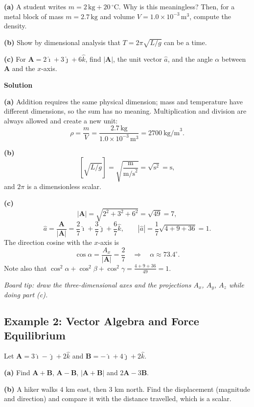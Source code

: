\documentclass[12pt]{article}
\begin{document}
\textbf{(a)} A student writes $m = 2\,\text{kg} + 20\,^\circ\text{C}$. Why is this meaningless? Then, for a metal block of mass $m = 2.7\,\text{kg}$ and volume $V = 1.0\times 10^{-3}\,\text{m}^3$, compute the density.

\textbf{(b)} Show by dimensional analysis that $T = 2\pi\sqrt{L/g}$ can be a time.

\textbf{(c)} For $\mathbf{A} = 2\hat{\imath} + 3\hat{\jmath} + 6\hat{k}$, find $|\mathbf{A}|$, the unit vector $\hat{a}$, and the angle $\alpha$ between $\mathbf{A}$ and the $x$-axis.

\bigskip
\textbf{Solution}

\textbf{(a)} Addition requires the same physical dimension; mass and temperature have different dimensions, so the sum has no meaning. Multiplication and division are always allowed and create a new unit:
\[
\rho = \frac{m}{V} = \frac{2.7\,\text{kg}}{1.0\times 10^{-3}\,\text{m}^3} = 2700\ \text{kg/m}^3 .
\]

\textbf{(b)}
\[
\left[\sqrt{L/g}\right] = \sqrt{\frac{\text{m}}{\text{m/s}^2}} = \sqrt{\text{s}^2} = \text{s},
\]
and $2\pi$ is a dimensionless scalar.

\textbf{(c)}
\[
|\mathbf{A}| = \sqrt{2^2+3^2+6^2} = \sqrt{49} = 7,
\]
\[
\hat{a} = \frac{\mathbf{A}}{|\mathbf{A}|} = \frac{2}{7}\hat{\imath} + \frac{3}{7}\hat{\jmath} + \frac{6}{7}\hat{k},
\qquad
|\hat{a}| = \frac{1}{7}\sqrt{4+9+36} = 1 .
\]
The direction cosine with the $x$-axis is
\[
\cos\alpha = \frac{A_x}{|\mathbf{A}|} = \frac{2}{7}
\quad \Longrightarrow \quad \alpha \approx 73.4^\circ .
\]
Note also that $\cos^2\alpha + \cos^2\beta + \cos^2\gamma = \frac{4+9+36}{49} = 1$.

\bigskip
\noindent \emph{Board tip: draw the three-dimensional axes and the projections $A_x$, $A_y$, $A_z$ while doing part (c).}


\subsection{Example 2: Vector Algebra and Force Equilibrium}

Let $\mathbf{A} = 3\hat{\imath} - \hat{\jmath} + 2\hat{k}$ and $\mathbf{B} = -\hat{\imath} + 4\hat{\jmath} + 2\hat{k}$.

\textbf{(a)} Find $\mathbf{A}+\mathbf{B}$, $\mathbf{A}-\mathbf{B}$, $|\mathbf{A}+\mathbf{B}|$ and $2\mathbf{A}-3\mathbf{B}$.

\textbf{(b)} A hiker walks $4$ km east, then $3$ km north. Find the displacement (magnitude and direction) and compare it with the distance travelled, which is a scalar.
\end{document}
